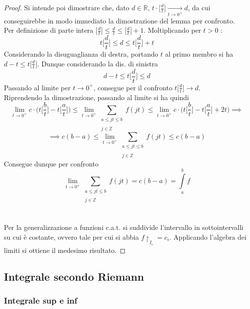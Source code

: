 \documentclass[10pt]{article}
\theoremstyle{plain}
\begin{document}
\begin{proof}
    Si intende poi dimostrare che, dato $d \in \mathbb{R}$, $t \cdot \big[ \frac{d}{t}\big] \xrightarrow[t \rightarrow 0^+]{} d$, da cui conseguirebbe in modo immediato la dimostrazione del lemma per confronto.
    \\Per definizione di parte intera $\big[\frac{d}{t}\big] \leq \frac{d}{t} \leq \big[\frac{d}{t}\big] + 1$. Moltiplicando per $t > 0$ :
    \[t \big[\frac{d}{t}\big] \leq d \leq t \big[\frac{d}{t}\big] + t\]
    Considerando la disuguaglianza di destra, portando $t$ al primo membro si ha $d - t \leq t \big[\frac{d}{t}\big]$. Dunque considerando la dis. di sinistra
    \[d - t \leq t \big[\frac{d}{t}\big] \leq d\]
    Passando al limite per $t \rightarrow 0^+$, consegue per il confronto $t \big[\frac{d}{t}\big] \rightarrow d$. 
    \\Riprendendo la dimostrazione, passando al limite si ha quindi 
    \[\lim \limits_{t \rightarrow 0^+} c \cdot \bigg(t \big[\frac{b}{t}\big] - t \big[\frac{a}{t}\big]\bigg) \leq \lim \limits_{t \rightarrow 0^+} \sum_{\substack{a \leq jt \leq b \\~\\ j \in \mathbb{Z}}} f(jt) \leq \lim \limits_{t \rightarrow 0^+} c \cdot \bigg(t \big[\frac{b}{t}\big] - t \big[\frac{a}{t}\big] + 2t \bigg) \implies\]
    \[\implies c(b - a) \leq \lim \limits_{t \rightarrow 0^+} \sum_{\substack{a \leq jt \leq b \\~\\ j \in \mathbb{Z}}} f(jt) \leq c(b - a)\]
    Consegue dunque per confronto
    \[\lim \limits_{t \rightarrow 0^+} \sum_{\substack{a \leq jt \leq b \\~\\ j \in \mathbb{Z}}} f(jt) = c (b - a) = \int\limits_{a}^{b} f\]
    \\~\\Per la generalizzazione a funzioni c.a.t. si suddivide l'intervallo in sottointervalli su cui è costante, ovvero tale per cui si abbia $f \restriction_{I_i} = c_i$. Applicando l'algebra dei limiti si ottiene il medesimo risultato.
\end{proof}

\subsection{Integrale secondo Riemann}

\subsubsection{Integrale sup e inf}
\end{document}
